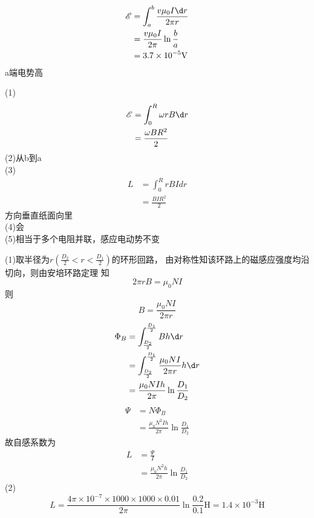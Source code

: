 \documentclass{phyasgn}
\begin{document}
\begin{sol}[3-11]
$$\begin{aligned}
    \mathscr{E}&=\int_a^b\frac{v\mu_0I\d r}{2\pi r}\\
    &=\frac{v\mu_0I}{2\pi}\ln\frac{b}{a}\\
    &=3.7\times 10^{-5}\text{V}
\end{aligned}$$
a端电势高
\end{sol}\par

\begin{sol}[3-13]
    (1)$$\begin{aligned}
        \mathscr{E}&=\int_0^R \omega rB\d r\\
        &=\frac{\omega BR^2 }{2}
    \end{aligned}$$
    (2)从b到a\\
    (3)$$\begin{aligned}
        L&=\int_0^R rBIdr\\
        &=\frac{BIR^2}{2}
    \end{aligned}$$
    方向垂直纸面向里\\
    (4)会\\
    (5)相当于多个电阻并联，感应电动势不变
\end{sol}\par

\begin{sol}[3-30]
    (1)取半径为$r$$(\frac{D_2}{2}<r<\frac{D_1}{2})$的环形回路，
    由对称性知该环路上的磁感应强度均沿切向，则由安培环路定理
    知
    $$
    2\pi r B=\mu_0 NI
    $$
    则
    $$
    B=\frac{\mu_0NI}{2\pi r}
    $$
    $$\begin{aligned}
        \Phi_B&=\int_{\frac{D_2}{2}}^{\frac{D_1}{2}}Bh\d r\\
        &=\int_{\frac{D_2}{2}}^{\frac{D_1}{2}}\frac{\mu_0NI}{2\pi r}h\d r\\
        &=\frac{\mu_0NIh}{2\pi}\ln\frac{D_1}{D_2}
    \end{aligned}$$
    $$\begin{aligned}
        \varPsi &=N\Phi_B\\
        &=\frac{\mu_0N^2Ih}{2\pi}\ln\frac{D_1}{D_2}
    \end{aligned}$$
    故自感系数为
    $$\begin{aligned}
        L&=\frac{\varPsi}{I}\\
        &=\frac{\mu_0N^2h}{2\pi}\ln\frac{D_1}{D_2}
    \end{aligned}$$
    (2)$$L=\frac{4\pi\times 10^{-7}\times 1000\times 1000\times 0.01}{2\pi}\ln\frac{0.2}{0.1}\text{H}=1.4\times 10^{-3}\text{H}$$
\end{sol}\par
\end{document}

